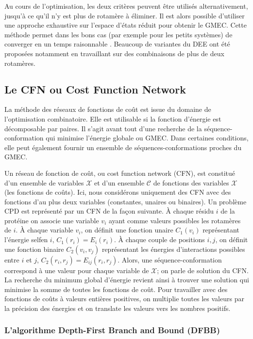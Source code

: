 Au cours de l'optimisation, les deux critères peuvent être utilisés alternativement, jusqu'à ce qu'il n'y est plus de rotamère à éliminer. Il est alors possible d'utiliser une approche exhaustive sur l'espace d'états réduit pour obtenir le GMEC. Cette méthode permet dans les bons cas (par exemple pour les petits systèmes) de converger en un temps raisonnable \cite{Leach98}. Beaucoup de variantes du DEE \cite{Pierce00,Lilien05} ont été proposées notamment en travaillant sur des combinaisons de plus de deux rotamères.


\subsection{Le CFN ou \og Cost Function Network\fg}

La méthode des réseaux de fonctions de coût est issue du domaine de l'optimisation combinatoire. Elle est utilisable si la fonction d'énergie est décomposable par paires. Il s'agit avant tout d'une recherche de la séquence-conformation qui minimise l'énergie globale ou GMEC. Dans certaines conditions, elle peut également fournir un ensemble de séquences-conformations proches du GMEC.

Un réseau de fonction de coût, ou \og cost function network  \fg (CFN), est constitué d'un ensemble de variables $\mathcal{X}$ et d'un ensemble $\mathcal{C}$ de fonctions des variables $\mathcal{X}$ (les fonctions de coûts). Ici, nous considérons uniquement des CFN avec des fonctions d'au plus deux variables (constantes, unaires ou binaires). Un problème CPD est représenté par un CFN de la façon suivante. À chaque résidu $i$ de la protéine on associe une variable $v_i$ ayant comme valeurs possibles les rotamères de $i$. À chaque variable $v_i$, on définit une fonction unaire $C_1(v_i)$ représentant l'énergie \og self\fg en $i$, $C_1(r_i)=E_i(r_i)$. À chaque couple de positions $i,j$, on définit une fonction binaire $C_2(v_i,v_j)$ représentant les énergies d'interactions possibles entre $i$ et $j$, $C_2(r_i,r_j)=E_{ij}(r_i,r_j)$. Alors, une séquence-conformation correspond à une valeur pour chaque variable de $\mathcal{X}$; on parle de solution du CFN. La recherche du minimum global d'énergie revient ainsi à trouver une solution qui minimise la somme de toutes les fonctions de coût. Pour travailler avec des fonctions de coûts à valeurs entières positives, on multiplie toutes les valeurs par la précision des énergies et on translate les valeurs vers les nombres positifs.
%
\subsubsection{L'algorithme \og Depth-First Branch and Bound \fg (DFBB)}

